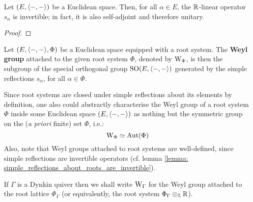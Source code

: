             \begin{lemma} \label{lemma: simple_reflections_about_roots_are_invertible}
                Let $(E, \langle-, -\rangle)$ be a Euclidean space. Then, for all $\alpha \in E$, the $\mathbb{R}$-linear operator $s_{\alpha}$ is invertible; in fact, it is also self-adjoint and therefore unitary.
            \end{lemma}
                \begin{proof}
                    
                \end{proof}
            \begin{definition} \label{def: weyl_groups}
                Let $(E, \langle-, -\rangle, \Phi)$ be a Euclidean space equipped with a root system. The \textbf{Weyl group} attached to the given root system $\Phi$, denoted by $\mathrm{W}_{\Phi}$, is then the subgroup of the special orthogonal group $\mathrm{SO}(E, \langle-, -\rangle)$ generated by the simple reflections $s_{\alpha}$, for all $\alpha \in \Phi$. 
            \end{definition}
            \begin{remark}
                Since root systems are closed under simple reflections about its elements by definition, one also could abstractly characterise the Weyl group of a root system $\Phi$ inside some Euclidean space $(E, \langle-, -\rangle)$ as nothing but the symmetric group on the (\textit{a priori} finite) set $\Phi$, i.e.:
                    $$\mathrm{W}_{\Phi} \simeq \mathrm{Aut}(\Phi)$$
                Also, note that Weyl groups attached to root systems are well-defined, since simple reflections are invertible operators (cf. lemma \ref{lemma: simple_reflections_about_roots_are_invertible}).
            \end{remark}
            \begin{convention}
                If $\Gamma$ is a Dynkin quiver then we shall write $\mathrm{W}_{\Gamma}$ for the Weyl group attached to the root lattice $\Phi_{\Gamma}$ (or equivalently, the root system $\Phi_{\Gamma} \tensor_{\Z} \R$). 
            \end{convention}
